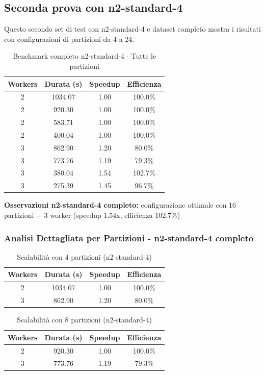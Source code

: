 \documentclass[8pt,a4paper]{article}
\begin{document}
\subsection{Seconda prova con n2-standard-4}

Questo secondo set di test con n2-standard-4 e dataset completo mostra i risultati con configurazioni di partizioni da 4 a 24.
\begin{table}[H]
\centering
\caption{Benchmark completo n2-standard-4 - Tutte le partizioni}
\label{tab:n2_complete_all}
\footnotesize
\begin{tabular}{|c|c|c|c|}
\hline
\textbf{Workers} & \textbf{Durata (s)} & \textbf{Speedup} & \textbf{Efficienza} \\
\hline
2 & 1034.07 & 1.00 & 100.0\% \\
2 & 920.30 & 1.00 & 100.0\% \\
2 & 583.71 & 1.00 & 100.0\% \\
2 & 400.04 & 1.00 & 100.0\% \\
\hline
3 & 862.90 & 1.20 & 80.0\% \\
3 & 773.76 & 1.19 & 79.3\% \\
3 & 380.04 & 1.54 & 102.7\% \\
3 & 275.39 & 1.45 & 96.7\% \\
\hline
\end{tabular}
\end{table}
\noindent
\textbf{Osservazioni n2-standard-4 completo:} configurazione ottimale con 16 partizioni + 3 worker (speedup 1.54x, efficienza 102.7\%)

\subsubsection{Analisi Dettagliata per Partizioni - n2-standard-4 completo}

\begin{table}[H]
\centering
\caption{Scalabilità con 4 partizioni (n2-standard-4)}
\begin{tabular}{|c|c|c|c|}
\hline
\textbf{Workers} & \textbf{Durata (s)} & \textbf{Speedup} & \textbf{Efficienza} \\
\hline
2 & 1034.07 & 1.00 & 100.0\% \\
3 & 862.90 & 1.20 & 80.0\% \\
\hline
\end{tabular}
\end{table}

\begin{table}[H]
\centering
\caption{Scalabilità con 8 partizioni (n2-standard-4)}
\begin{tabular}{|c|c|c|c|}
\hline
\textbf{Workers} & \textbf{Durata (s)} & \textbf{Speedup} & \textbf{Efficienza} \\
\hline
2 & 920.30 & 1.00 & 100.0\% \\
3 & 773.76 & 1.19 & 79.3\% \\
\hline
\end{tabular}
\end{table}
\end{document}
